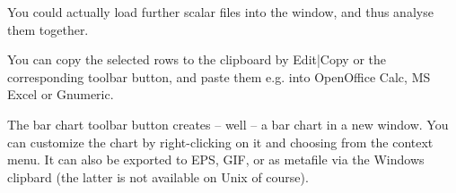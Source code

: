You could actually load further scalar files into the window,
and thus analyse them together.

You can copy the selected rows to the clipboard by Edit|Copy or
the corresponding toolbar button, and paste them e.g. into
OpenOffice Calc, MS Excel or Gnumeric.

The bar chart toolbar button creates -- well -- a bar chart
in a new window. You can customize the chart by right-clicking
on it and choosing from the context menu. It can also be exported
to EPS, GIF, or as metafile via the Windows clipbard (the latter
is not available on Unix of course).




